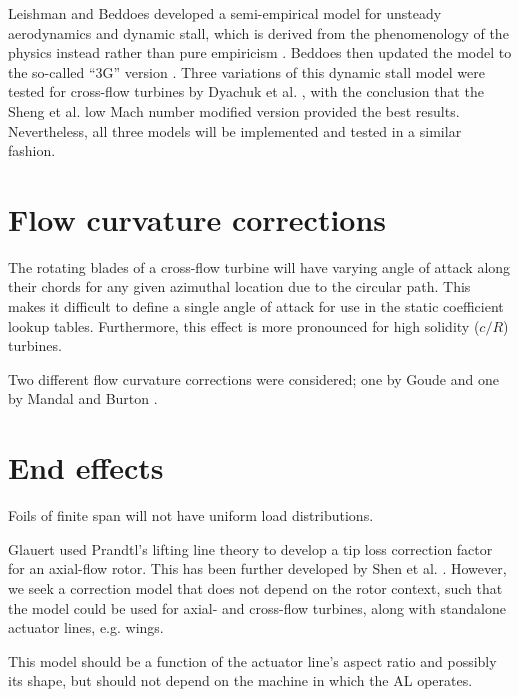 Leishman and Beddoes developed a semi-empirical model for unsteady aerodynamics
and dynamic stall, which is derived from the phenomenology of the physics
instead rather than pure empiricism \cite{Leishman1989}. Beddoes then updated
the model to the so-called ``3G'' version \cite{Beddoes1993}. Three variations
of this dynamic stall model were tested for cross-flow turbines by Dyachuk et
al. \cite{Dyachuk2014}, with the conclusion that the Sheng et al. low Mach
number modified version \cite{Sheng2008} provided the best results.
Nevertheless, all three models will be implemented and tested in a similar
fashion.


\section{Flow curvature corrections}

The rotating blades of a cross-flow turbine will have varying angle of attack
along their chords for any given azimuthal location due to the circular path.
This makes it difficult to define a single angle of attack for use in the static
coefficient lookup tables. Furthermore, this effect is more pronounced for high
solidity ($c/R$) turbines.


Two different flow curvature corrections were considered; one by Goude
\cite{Goude2012} and one by Mandal and Burton \cite{Mandal1994}.


\section{End effects}

Foils of finite span will not have uniform load distributions.

Glauert used Prandtl's lifting line theory to develop a tip loss correction
factor for an axial-flow rotor. This has been further developed by Shen et al.
\cite{Shen2005a}. However, we seek a correction model that does not depend on
the rotor context, such that the model could be used for axial- and cross-flow
turbines, along with standalone actuator lines, e.g. wings.

This model should be a function of the actuator line's aspect ratio and possibly
its shape, but should not depend on the machine in which the AL operates.

